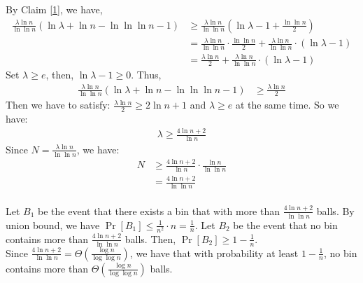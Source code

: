 By Claim \ref{1},
we have,
\begin{align}
    \nonumber \frac{\lambda \ln n}{\ln \ln n}(\ln \lambda +\ln n -\ln \ln \ln n -1) &\ge \frac{\lambda \ln n}{\ln \ln n}(\ln \lambda -1 +\frac{\ln \ln n}{2})\\
    \nonumber &=\frac{\lambda \ln n}{\ln \ln n}\cdot \frac{\ln\ln n}{2}+\frac{\lambda \ln n}{\ln \ln n}\cdot(\ln\lambda-1)\\
    \nonumber &=\frac{\lambda \ln n}{2} +\frac{\lambda \ln n}{\ln \ln n}\cdot(\ln\lambda-1)
\end{align}
Set $\lambda \ge e$, then, $\ln\lambda-1 \ge 0$. Thus,
\begin{align}
    \nonumber \frac{\lambda \ln n}{\ln \ln n}(\ln \lambda +\ln n -\ln \ln \ln n -1) &\ge \frac{\lambda \ln n}{2}
\end{align}
Then we have to satisfy:
$\frac{\lambda \ln n}{2} \ge 2\ln n +1$ and $\lambda \ge e$ at the same time. So we have:
\begin{align}
    \nonumber \lambda \ge \frac{4\ln n +2}{\ln n}
\end{align}
Since $N=\frac{\lambda \ln n}{\ln \ln n}$, we have:
\begin{align}
    \nonumber N&\ge \frac{4\ln n +2}{\ln n}\cdot \frac{\ln n}{\ln \ln n}\\
    \nonumber &= \frac{4\ln n +2}{\ln \ln n}
\end{align}
\noindent{}\\
Let $B_1$ be the event that there exists a bin that with more than $\frac{4\ln n +2}{\ln \ln n}$ balls.
By union bound, we have $\Pr[B_1]\le\frac{1}{n^2}\cdot n=\frac{1}{n}$.
Let $B_2$ be the event that no bin contains more than $\frac{4\ln n +2}{\ln \ln n}$ balls.
Then, $\Pr[B_2]\ge 1-\frac{1}{n}$.\\
Since $\frac{4\ln n +2}{\ln \ln n}=\Theta(\frac{\log n}{\log\log n})$, we have that with probability at least $1-\frac{1}{n}$, no bin contains more than $\Theta(\frac{\log n}{\log\log n})$ balls.